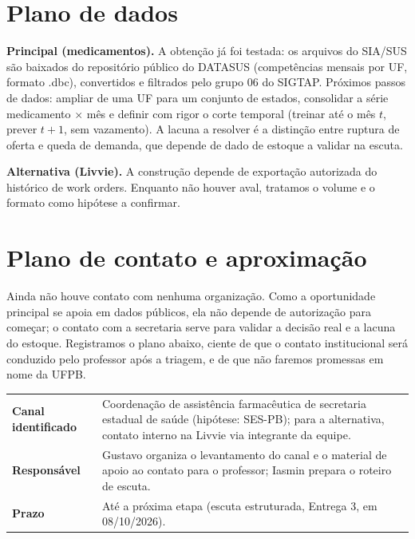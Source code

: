 \documentclass[11pt,a4paper]{article}
\begin{document}
\section{Plano de dados}

\textbf{Principal (medicamentos).} A obtenção já foi testada: os arquivos do SIA/SUS são baixados do repositório público do DATASUS (competências mensais por UF, formato .dbc), convertidos e filtrados pelo grupo 06 do SIGTAP. Próximos passos de dados: ampliar de uma UF para um conjunto de estados, consolidar a série medicamento $\times$ mês e definir com rigor o corte temporal (treinar até o mês $t$, prever $t+1$, sem vazamento). A lacuna a resolver é a distinção entre ruptura de oferta e queda de demanda, que depende de dado de estoque a validar na escuta.

\textbf{Alternativa (Livvie).} A construção depende de exportação autorizada do histórico de work orders. Enquanto não houver aval, tratamos o volume e o formato como hipótese a confirmar.

\section{Plano de contato e aproximação}

Ainda não houve contato com nenhuma organização. Como a oportunidade principal se apoia em dados públicos, ela não depende de autorização para começar; o contato com a secretaria serve para validar a decisão real e a lacuna do estoque. Registramos o plano abaixo, ciente de que o contato institucional será conduzido pelo professor após a triagem, e de que não faremos promessas em nome da UFPB.

\begin{tabularx}{\textwidth}{@{}>{\bfseries}p{3.3cm} X@{}}
\toprule
\textbf{Canal identificado} & Coordenação de assistência farmacêutica de secretaria estadual de saúde (hipótese: SES-PB); para a alternativa, contato interno na Livvie via integrante da equipe. \\ \addlinespace[2pt]
\textbf{Responsável} & Gustavo organiza o levantamento do canal e o material de apoio ao contato para o professor; Iasmin prepara o roteiro de escuta. \\ \addlinespace[2pt]
\textbf{Prazo} & Até a próxima etapa (escuta estruturada, Entrega 3, em 08/10/2026). \\
\bottomrule
\end{tabularx}
\end{document}
